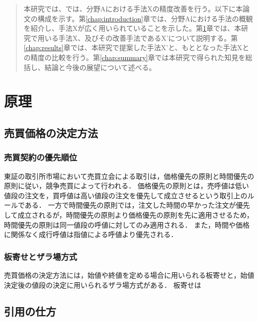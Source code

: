 \documentclass[titlepage]{jsreport}
\begin{document}
\begin{quotation}
    本研究では、では、分野Aにおける手法Xの精度改善を行う。以下に本論文の構成を示す。第\ref{chap:introduction}章では、分野Aにおける手法の概観を紹介し、手法Xが広く用いられていることを示した。第\ref{chap:method}章では、本研究で用いる手法X、及びその改善手法であるX'について説明する。第\ref{chap:results}章では、本研究で提案した手法X'と、もととなった手法Xとの精度の比較を行う。第\ref{chap:summary}章では本研究で得られた知見を総括し、結論と今後の展望について述べる。
\end{quotation}

\chapter{原理} \label{chap:method}

\section{売買価格の決定方法}
\subsection{売買契約の優先順位}
東証の取引所市場において売買立会による取引は，価格優先の原則と時間優先の原則に従い，競争売買によって行われる\cite{shokengaimuin}．
価格優先の原則とは，売呼値は低い値段の注文を，買呼値は高い値段の注文を優先して成立させるという取引上のルールである．
一方で時間優先の原則では，注文した時間の早かった注文が優先して成立されるが，時間優先の原則より価格優先の原則を先に適用させるため，時間優先の原則は同一値段の呼値に対してのみ適用される．
また，時間や価格に関係なく成行呼値は指値による呼値より優先される．

\subsection{板寄せとザラ場方式}
売買価格の決定方法には，始値や終値を定める場合に用いられる板寄せと，始値決定後の値段の決定に用いられるザラ場方式がある\cite{shokengaimuin}．
板寄せは















\section{引用の仕方}
\end{document}
